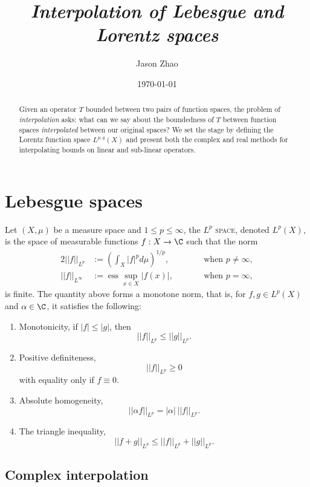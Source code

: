 \documentclass[reqno]{amsart}
\title
{
	\emph{Interpolation of Lebesgue and Lorentz spaces}
}
\author{Jason Zhao}
\date{\today}
\theoremstyle{definition}
\theoremstyle{remark}
\renewcommand{\emph}{\textsc}
\begin{document}
\maketitle

\begin{abstract}
	Given an operator $T$ bounded between two pairs of function spaces, the problem of \textit{interpolation} asks: what can we say about the boundedness of $T$ between function spaces \textit{interpolated} between our original spaces? We set the stage by defining the Lorentz function space $L^{p, q} (X)$ and present both the complex and real methods for interpolating bounds on linear and sub-linear operators. 
\end{abstract}

\tableofcontents

\section{Lebesgue spaces}

Let $(X, \mu)$ be a measure space and $1\leq p \leq \infty$, the \emph{$L^p$ space}, denoted $L^p (X)$, is the space of measurable functions $f: X \to \C$ such that the norm
	\begin{alignat*}{2}
		||f||_{L^p} 
			&:= \left( \int_X |f|^p d \mu \right)^{1/p}, 
			&&\qquad \text{when $p \neq \infty$}, \\
		||	f||_{L^\infty}
			&:= \operatorname{ess} \sup_{x \in X} |f(x)|,
			&&\qquad \text{when $p = \infty$,}
	\end{alignat*}
is finite. The quantity above forms a monotone norm, that is, for $f, g \in L^p (X)$ and $\alpha \in \C$, it satisfies the following:
\begin{enumerate}
	\item Monotonicity, if $|f| \leq |g|$, then 
		\[ ||f||_{L^p} \leq ||g||_{L^p}. \]
	\item Positive definiteness, 
		\[||f||_{L^p} \geq 0 \]
	with equality only if $f \equiv 0$. 	
	\item Absolute homogeneity, 
		\[ ||\alpha f||_{L^p} = |\alpha| \, ||f||_{L^p}. \]
	\item The triangle inequality, 
		\[ ||f + g||_{L^p} \leq ||f||_{L^p} + ||g||_{L^p}. \]
\end{enumerate}



\subsection{Complex interpolation}
\end{document}
